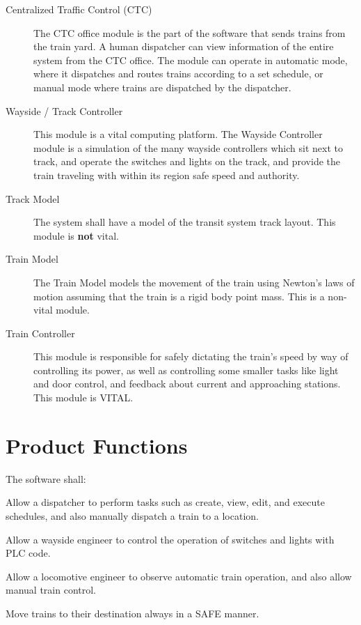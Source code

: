 \documentclass{scrreprt}
\begin{document}
\begin{description}
    \item[Centralized Traffic Control (CTC)] The CTC office module is the part of the software that sends trains from the train yard.
    A human dispatcher can view information of the entire system from the CTC office.
    The module can operate in automatic mode, where it dispatches and routes trains according to a set schedule, or manual mode where trains are dispatched by the dispatcher.
    \item[Wayside / Track Controller] This module is a vital computing platform.
    The Wayside Controller module is a simulation of the many wayside controllers which sit next to track, and operate the switches and lights on the track, and provide the train traveling with within its region safe speed and authority.
    \item[Track Model] The system shall have a model of the transit system track layout. This module is \textbf{not} vital.
    \item[Train Model] The Train Model models the movement of the train using Newton's laws of motion
    assuming that the train is a rigid body point mass. This is a non-vital module.
    \item[Train Controller] This module is responsible for safely dictating the train's speed by way of controlling its power, as well as controlling some smaller tasks like light and door control, and feedback about current and approaching stations. This module is VITAL.
\end{description}



\section{Product Functions}
The software shall:
    \begin{numonly}
        \item Allow a dispatcher to perform tasks such as create, view, edit, and execute schedules, and also manually dispatch a train to a location.
        \item Allow a wayside engineer to control the operation of switches and lights with PLC code.
        \item Allow a locomotive engineer to observe automatic train operation, and also allow manual train control.
        \item Move trains to their destination always in a SAFE manner.
    \end{numonly}
\end{document}
